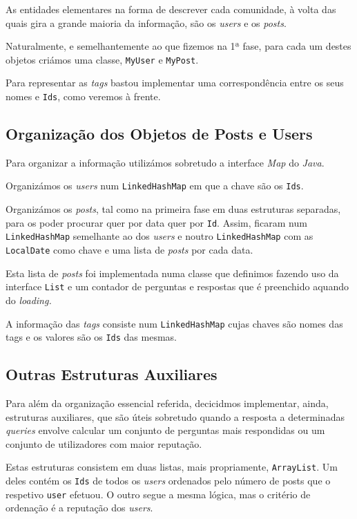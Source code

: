 \documentclass[10pt]{article}
\begin{document}
		As entidades elementares na forma de descrever cada comunidade, 	à volta das quais
	gira a grande maioria da informação, são os \textit{users} e os 			\textit{posts}.
	
		Naturalmente, e semelhantemente ao que fizemos na 1ª fase, 
	para cada um destes objetos criámos uma classe, \texttt{MyUser} 
	e \texttt{MyPost}.
	
		Para representar as \textit{tags} bastou implementar uma 
	correspondência entre os seus nomes e \texttt{Ids}, como veremos 
	à frente.
	

\subsection{Organização dos Objetos de Posts e Users}
		Para organizar a informação utilizámos sobretudo a interface
	\emph{Map} do \textit{Java}.
	
		Organizámos os \textit{users} num \texttt{LinkedHashMap} em 
		que a chave são os \texttt{Ids}.
	
		Organizámos os \textit{posts}, tal como na primeira fase em
	duas estruturas separadas, para os poder procurar quer por data
	quer por \texttt{Id}.  Assim, ficaram num \texttt{LinkedHashMap} 
	semelhante ao dos \textit{users} e noutro \texttt{LinkedHashMap} 
	com as \texttt{LocalDate} como chave e uma lista de \textit{posts} 
	por cada data.
	
		Esta lista de \textit{posts} foi implementada numa classe 
	que definimos fazendo uso da interface \texttt{List} e um contador 
	de perguntas e respostas que é preenchido aquando do 
	\textit{loading.}
	
		A informação das \textit{tags} consiste num 
		\texttt{LinkedHashMap} cujas chaves são nomes das tags e 
		os valores são os \texttt{Ids} das mesmas.
		
	
\subsection{Outras Estruturas Auxiliares}
		
		Para além da organização essencial referida, decicidmos 
	implementar, ainda, estruturas auxiliares, que são úteis sobretudo 
	quando a resposta a determinadas \textit{queries} envolve calcular 
	um conjunto de perguntas mais respondidas ou um conjunto de 
	utilizadores com maior reputação.
	
		Estas estruturas consistem em duas listas, mais propriamente, 
	\texttt{ArrayList}. Um deles contém os \texttt{Ids} de todos os
	\textit{users} ordenados pelo número de posts que o respetivo
	\texttt{user} efetuou. O outro segue a mesma lógica, mas o 
	critério de ordenação é a reputação dos \textit{users}.
	
\end{document}
